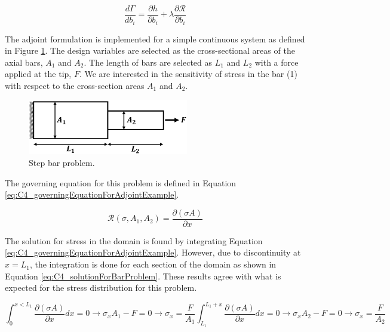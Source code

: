 \begin{equation}\label{eq:C4_functionSensitivityAdjoint}
    \frac{d \Gamma}{d b_i} = 
    \frac{\partial h}{\partial b_i} + 
    \lambda \frac{\partial \mathcal{R}}{\partial b_i}
\end{equation}

The adjoint formulation is implemented for a simple continuous system as defined in Figure \ref{fig:C4_stepBeamAdjoint}. The design variables are selected as the cross-sectional areas of the axial bars, $A_1$ and $A_2$. The length of bars are selected as $L_1$ and $L_2$ with a force applied at the tip, $F$. We are interested in the sensitivity of stress in the bar (1) with respect to the cross-section areas $A_1$ and $A_2$.

\begin{figure}[H]
    \centering
    \includegraphics[width=7.00cm]{Chapter_4/figure/beam_adjoint_example_problem.png}
    \caption{Step bar problem.}
    \label{fig:C4_stepBeamAdjoint}
\end{figure}

The governing equation for this problem is defined in Equation \eqref{eq:C4_governingEquationForAdjointExample}.

\begin{equation}\label{eq:C4_governingEquationForAdjointExample}
    \mathcal{R}(\sigma, A_1, A_2) = \frac{\partial (\sigma A)}{\partial x}
\end{equation}

The solution for stress in the domain is found by integrating Equation \eqref{eq:C4_governingEquationForAdjointExample}. However, due to discontinuity at $x = L_1$, the integration is done for each section of the domain as shown in Equation \eqref{eq:C4_solutionForBarProblem}. These results agree with what is expected for the stress distribution for this problem.

\begin{subequations}\label{eq:C4_solutionForBarProblem}
\begin{equation}
    \int_0^{x < L_1} \frac{\partial (\sigma A)}{\partial x} dx = 0 \rightarrow \sigma_x A_1 - F = 0 \rightarrow \sigma_x = \frac{F}{A_1}
\end{equation}
\begin{equation}
    \int_{L_1}^{L_1 + x} \frac{\partial (\sigma A)}{\partial x} dx = 0 \rightarrow \sigma_x A_2 - F = 0 \rightarrow \sigma_x = \frac{F}{A_2}
\end{equation}
\end{subequations}

